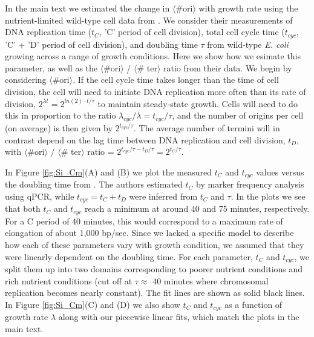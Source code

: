 In the main text we estimated the change in $\langle$\#ori$\rangle$ with growth
rate using the nutrient-limited wild-type cell data from \cite{si2017}. We
consider their measurements of DNA replication time ($t_{C}$, 'C' period of
cell division), total cell cycle time ($t_{cyc}$, 'C' + 'D' period of cell
division), and doubling time $\tau$ from wild-type \textit{E. coli} growing
across a range of growth conditions. Here we show how we  esimate this
parameter, as well as the $\langle$\#ori$\rangle$ / $\langle$\# ter$\rangle$
ratio from their data.  We begin by considering $\langle$\#ori$\rangle$. If the
cell cycle time takes longer  than the time of cell division, the cell will need
to initiate DNA replication  more often than its rate of division, $2^{\lambda
t} = 2^{ln(2) \cdot t/ \tau}$ to maintain steady-state growth. Cells will need
to do this in proportion to the ratio $\lambda_{cyc} / \lambda =  t_{cyc}/\tau$,
and the number of origins per cell (on average) is then given by $2^{t_{cyc}/
\tau}$.   The average number of termini will in contrast depend on the lag time
between  DNA replication and cell division, $t_{D}$, with
$\langle$\#ori$\rangle$ / $\langle$\# ter$\rangle$ ratio = $2^{t_{cyc}/ \tau -
t_{D}/ \tau} =  2^{t_{C}/ \tau}$.

In Figure \ref{fig:Si_Cm}(A) and (B) we plot the measured $t_{C}$ and $t_{cyc}$
values versus the doubling time from \cite{si2017}. The authors estimated
$t_{C}$ by marker frequency analysis using qPCR, while  $t_{cyc} = t_{C} +
t_{D}$ were inferred from $t_{C}$ and $\tau$. In the plots we see that both
$t_{C}$ and $t_{cyc}$ reach a minimum  at around 40 and 75 minutes,
respectively. For a C period of 40 minutes, this would correspond to a maximum
rate of elongation of about 1,000 bp/sec. Since we lacked a specific model to
describe how each of these parameters vary with growth condition, we assumed
that they were linearly dependent on the doubling time. For each parameter,
$t_{C}$ and $t_{cyc}$, we split them up into two domains corresponding to poorer
nutrient conditions and rich nutrient conditions (cut off at $\tau \approx$ 40
minutes where chromosomal replication becomes nearly constant). The fit lines
are shown as solid black lines. In Figure \ref{fig:Si_Cm}(C) and (D) we also
show $t_{C}$ and $t_{cyc}$ as a function of growth rate $\lambda$ along with our
piecewise linear fits, which match the plots in the main text.


